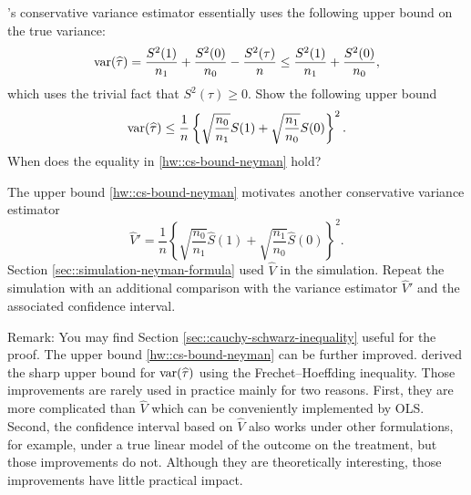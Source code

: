 \begin{HomeworkProblem}\label{exr:4-5}


\cite{Neyman:1923}'s conservative variance estimator essentially uses the following upper bound on the true variance:
\[
\textup{var}(\widehat{\tau}) = \frac{S^2(1)}{n_1} + \frac{S^2(0)}{n_0} - \frac{S^2(\tau)}{n} \leq \frac{S^2(1)}{n_1} + \frac{S^2(0)}{n_0},
\]
which uses the trivial fact that $S^2(\tau) \geq 0$.
Show the following upper bound
\begin{eqnarray}\label{hw::cs-bound-neyman}
\textup{var}(\widehat{\tau})  \leq   \frac{1}{n} \left\{   \sqrt{  \frac{n_0}{n_1}  } S(1) +  \sqrt{  \frac{n_1}{n_0}  } S(0)   \right\}^2.
\end{eqnarray}
When does the equality in \eqref{hw::cs-bound-neyman} hold?

The upper bound \eqref{hw::cs-bound-neyman} motivates another conservative variance estimator
\[
\hat{V}' =  \frac{1}{n} \left\{   \sqrt{  \frac{n_0}{n_1}  } \hat S(1) +  \sqrt{  \frac{n_1}{n_0}  } \hat S(0)   \right\}^2.
\]
Section \ref{sec::simulation-neyman-formula} used $\hat{V}$ in the simulation. Repeat the simulation with an additional comparison with the variance estimator $\hat{V}' $ and the associated confidence interval.



Remark:
You may find Section \ref{sec::cauchy-schwarz-inequality} useful for the proof.
The upper bound \eqref{hw::cs-bound-neyman} can be further improved.
\citet{aronow2014sharp} derived the sharp upper bound for $\textup{var}(\widehat{\tau}) $ using the Frechet--Hoeffding inequality. Those improvements are rarely used in practice mainly for two reasons. First, they are more complicated than $\hat{V}$ which can be conveniently implemented by OLS. Second, the confidence interval based on  $\hat{V}$ also works under other formulations, for example, under a true linear model of the outcome on the treatment, but those improvements do not. Although they are theoretically interesting, those improvements have little practical impact.



\end{HomeworkProblem}

